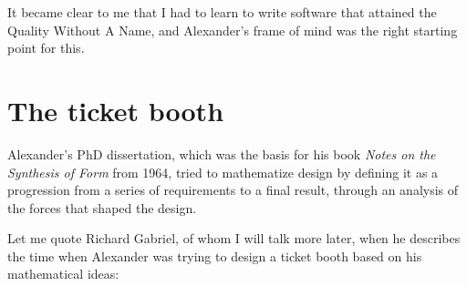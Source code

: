 It became clear to me that I had to learn to write software that attained the Quality Without A Name, and Alexander's frame of mind was the right starting point for this.

\section*{The ticket booth}

Alexander's PhD dissertation, which was the basis for his book \textit{Notes on the Synthesis of Form} from 1964, tried to mathematize design by defining it as a progression from a series of requirements to a final result, through an analysis of the forces that shaped the design.

Let me quote Richard Gabriel, of whom I will talk more later, when he describes the time when Alexander was trying to design a ticket booth based on his mathematical ideas:

